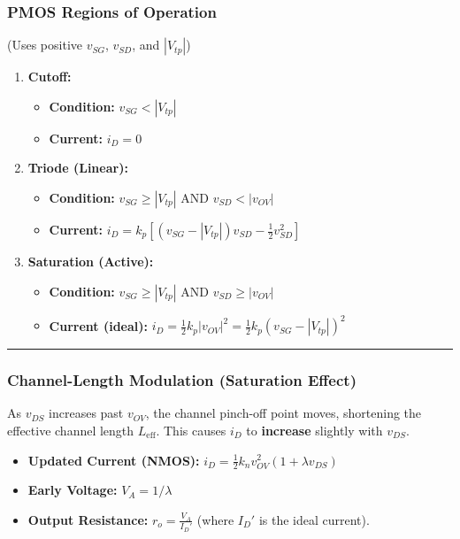 \documentclass[10pt, letterpaper]{article}
\begin{document}
\subsubsection*{PMOS Regions of Operation} (Uses positive $v_{SG}$, $v_{SD}$, and $|V_{tp}|$)
\begin{enumerate}
    \item \textbf{Cutoff:}
    \begin{itemize}
        \item \textbf{Condition:} $v_{SG} < |V_{tp}|$
        \item \textbf{Current:} $i_D = 0$
    \end{itemize}
    \item \textbf{Triode (Linear):}
    \begin{itemize}
        \item \textbf{Condition:} $v_{SG} \ge |V_{tp}|$ AND $v_{SD} < |v_{OV}|$
        \item \textbf{Current:} $i_D = k_p \left[ (v_{SG} - |V_{tp}|) v_{SD} - \frac{1}{2} v_{SD}^2 \right]$
    \end{itemize}
    \item \textbf{Saturation (Active):}
    \begin{itemize}
        \item \textbf{Condition:} $v_{SG} \ge |V_{tp}|$ AND $v_{SD} \ge |v_{OV}|$
        \item \textbf{Current (ideal):} $i_D = \frac{1}{2} k_p |v_{OV}|^2 = \frac{1}{2} k_p (v_{SG} - |V_{tp}|)^2$
    \end{itemize}
\end{enumerate}

\hrule

\subsubsection*{Channel-Length Modulation (Saturation Effect)}
As $v_{DS}$ increases past $v_{OV}$, the channel pinch-off point moves, shortening the effective channel length $L_{\text{eff}}$. This causes $i_D$ to \textbf{increase} slightly with $v_{DS}$.
\begin{itemize}
    \item \textbf{Updated Current (NMOS):} $i_D = \frac{1}{2} k_n v_{OV}^2 (1 + \lambda v_{DS})$
    \item \textbf{Early Voltage:} $V_A = 1 / \lambda$
    \item \textbf{Output Resistance:} $r_o = \frac{V_A}{I_D'}$ (where $I_D'$ is the ideal current).
\end{itemize}
\end{document}
